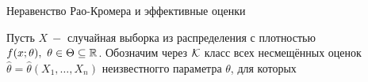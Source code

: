 \setcounter{mainpr}{10}
\setcounter{subpr}{0}

\setcounter{mainex}{10}
\setcounter{subex}{0}

\setcounter{mainta}{10}
\setcounter{subta}{0}

\setcounter{mainle}{10}
\setcounter{suble}{0}
\newpage

\begin{center}
    Неравенство Рао-Кромера и эффективные оценки
\end{center}
Пусть $X\ -$ случайная выборка из распределения с плотностью $f(x; \theta),\ \theta \in \Theta \subseteq \mathbb{R}$. Обозначим через $\mathcal{K}$ класс всех несмещённых оценок $\widehat{\theta} = \widehat{\theta}(X_1,\dots,X_n)$ неизвестногго параметра $\theta$, для которых 

